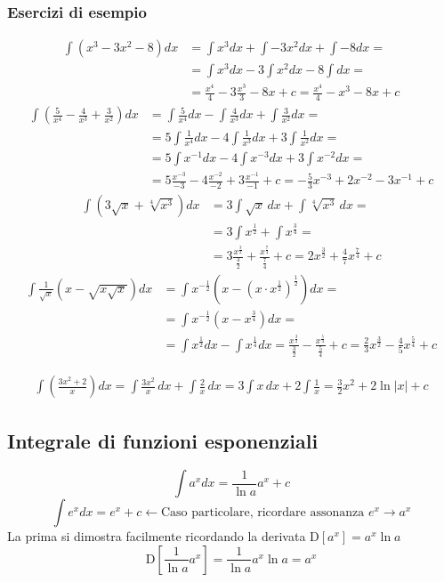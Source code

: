\documentclass[11pt]{article}
\begin{document}
\subsubsection*{Esercizi di esempio}
\begin{align*}\int(x^3-3x^2-8)dx&=\int x^3 dx + \int - 3x^2 dx+\int -8 dx =\\&=\int x^3 dx - 3 \int x^2 dx -8 \int dx=\\&=\frac{x^4}{4}-3\frac{x^3}{3}-8x+c=\boxed{\frac{x^4}{4}-x^3-8x+c}\end{align*}
\begin{align*}\int\left(\frac{5}{x^4}-\frac{4}{x^3}+\frac{3}{x^2}\right)dx&=\int\frac{5}{x^4}dx-\int\frac{4}{x^3}dx+\int\frac{3}{x^2}dx=\\&=5\int\frac{1}{x^4}dx-4\int\frac{1}{x^3}dx+3\int\frac{1}{x^2}dx=\\&=5\int x^{-1}dx-4\int x^{-3}dx+3\int x^{-2}dx=\\&=5\frac{x^{-3}}{-3}-4\frac{x^{-2}}{-2}+3\frac{x^{-1}}{-1}+c=\boxed{-\frac{5}{3}x^{-3}+2x^{-2}-3x^{-1}+c}\end{align*}
\begin{align*}\int(3\sqrt{x}+\sqrt[4]{x^3})dx&=3\int\sqrt{x}\,dx+\int\sqrt[4]{x^3}\,dx=\\&=3\int x^{\frac{1}{2}}+\int x^{\frac{3}{4}}=\\&=3\frac{x^{\frac{3}{2}}}{\frac{3}{2}}+\frac{x^{\frac{7}{4}}}{\frac{7}{4}}+c=\boxed{2x^{\frac{3}{2}}+\frac{4}{7}x^{\frac{7}{4}}+c}\end{align*}
\begin{align*}\int \frac{1}{\sqrt{x}}\left(x-\sqrt{x\sqrt{x}}\right)dx&=\int x^{-\frac{1}{2}}\left(x-\left(x \cdot x^{\frac{1}{2}}\right)^{\frac{1}{2}}\right)dx=\\&=\int x^{-\frac{1}{2}}\left(x-x^{\frac{3}{4}}\right)dx=\\&=\int x^{\frac{1}{2}}dx-\int x^{\frac{1}{4}}dx=\frac{x^{\frac{3}{2}}}{\frac{3}{2}}-\frac{x^{\frac{5}{4}}}{\frac{5}{4}}+c=\boxed{\frac{2}{3}x^{\frac{3}{2}}-\frac{4}{5}x^{\frac{5}{4}}+c}\end{align*}

\begin{align*}  \int \left(\frac{3x^2+2}{x}\right)dx =\int \frac{3x^2}{x}\,dx+\int \frac{2}{x}\,dx=3\int x \,dx+2\int \frac{1}{x}=\boxed{\frac{3}{2}x^2+2\ln|x|+c}\end{align*}

\subsection{Integrale di funzioni esponenziali}
\[\boxed{\int a^x dx = \frac{1}{\ln a} a^x + c}\]
\[\boxed{\int e^x dx = e^x + c} \longleftarrow \text{Caso particolare, ricordare assonanza $\boxed{e^x \longrightarrow a^x}$}\]
La prima si dimostra facilmente ricordando la derivata $\text{D}\left[a^x\right]=a^x \ln a$
\[\text{D}\left[\frac{1}{\ln a} a^x \right]=\frac{1}{\ln a} a^x \ln a = a^x\]
\end{document}
